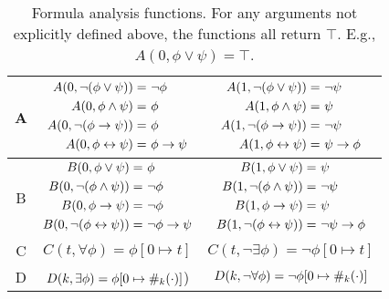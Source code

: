\begin{table}
    \centering
    \begin{tabular}{|c|cc|}
    \hline
    A & 
    {
      $\begin{aligned}
        A(0, \lnot (\phi \lor \psi)) =&\ \lnot \phi\\ 
        A(0, \phi \land \psi) =&\ \phi\\ 
        A(0, \lnot (\phi \to \psi)) =&\ \phi\\ 
        A(0, \phi \leftrightarrow \psi) =&\ \phi \to \psi
      \end{aligned}$
    } &  
    {
      $\begin{aligned}
        A(1, \lnot (\phi \lor \psi)) =&\ \lnot \psi\\
        A(1, \phi \land \psi) =&\  \psi\\
        A(1, \lnot (\phi \to \psi)) =&\  \lnot \psi\\
        A(1, \phi \leftrightarrow \psi) =&\  \psi \to \phi
      \end{aligned}$
    } 
    \\ \hline
    B &
    {
      $\begin{aligned}
        B(0, \phi \lor \psi) =&\  \phi\\ 
        B(0, \lnot (\phi \land \psi)) =&\  \lnot \phi\\ 
        B(0, \phi \to \psi) =&\  \lnot \phi\\ 
        B(0, \lnot (\phi \leftrightarrow \psi)) =&\  \lnot \phi \to \psi
      \end{aligned}$
    } &  
    {
      $\begin{aligned}
        B(1, \phi \lor \psi) =&\  \psi\\
        B(1, \lnot (\phi \land \psi)) =&\  \lnot \psi\\
        B(1, \phi \to \psi) =&\  \psi\\
        B(1, \lnot (\phi \leftrightarrow \psi)) =&\  \lnot \psi \to \phi
      \end{aligned}$
    } 
    \\ \hline
    C & 
    $C(t, \forall \phi) = \phi [0 \mapsto t]$ &
    $C(t, \lnot \exists \phi) = \lnot \phi [0 \mapsto t]$
     \\ \hline
    D & 
    $D(k, \exists \phi) = \phi [0 \mapsto \#_{k}(\cdot)]$) &
    $D(k, \lnot \forall \phi) = \lnot \phi [0 \mapsto \#_{k}(\cdot)]$ 
    \\ \hline
    \end{tabular}
      \caption{
        Formula analysis functions. For any arguments not explicitly defined above, 
        the functions all return $\top$. E.g., $A(0, \phi \lor \psi) = \top$.
      }
      \label{tab:faf}
    \end{table}
    